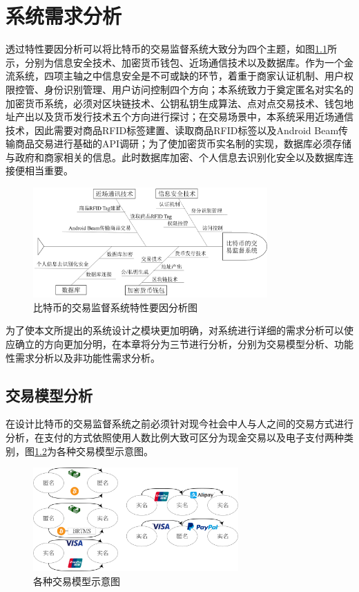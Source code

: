 \chapter{系统需求分析}

透过特性要因分析可以将比特币的交易监督系统大致分为四个主题，如图\ref{fish1}所示，分别为信息安全技术、加密货币钱包、近场通信技术以及数据库。作为⼀个⾦流系统，四项主轴之中信息安全是不可或缺的环节，着重于商家认证机制、用户权限控管、身份识别管理、用户访问控制四个方向；本系统致力于奠定匿名对实名的加密货币系统，必须对区块链技术、公钥私钥生成算法、点对点交易技术、钱包地址产出以及货币发行技术五个方向进行探讨；在交易场景中，本系统采用近场通信技术，因此需要对商品RFID标签建置、读取商品RFID标签以及Android Beam传输商品交易进行基础的API调研；为了使加密货币实名制的实现，数据库必须存储与政府和商家相关的信息。此时数据库加密、个人信息去识别化安全以及数据库连接便相当重要。
		\begin{figure}[!htbp]
			\centering
			\includegraphics[width = 0.8\textwidth]{fish1.png}
			\caption{⽐特币的交易监督系统特性要因分析图}\label{fish1}
		\end{figure}

为了使本⽂所提出的系统设计之模块更加明确，对系统进⾏详细的需求分析可以使应确⽴的⽅向更加分明，在本章将分为三节进行分析，分别为交易模型分析、功能性需求分析以及非功能性需求分析。


\section{交易模型分析}

在设计比特币的交易监督系统之前必须针对现今社会中人与人之间的交易方式进行分析，在支付的方式依照使用人数比例大致可区分为现金交易以及电子支付两种类别，图\ref{modeall}为各种交易模型示意图。
\begin{figure}[!htbp]
	\centering
	\includegraphics[width = 0.7\textwidth]{modeall.png}
	\caption{各种交易模型示意图}\label{modeall}
\end{figure}


